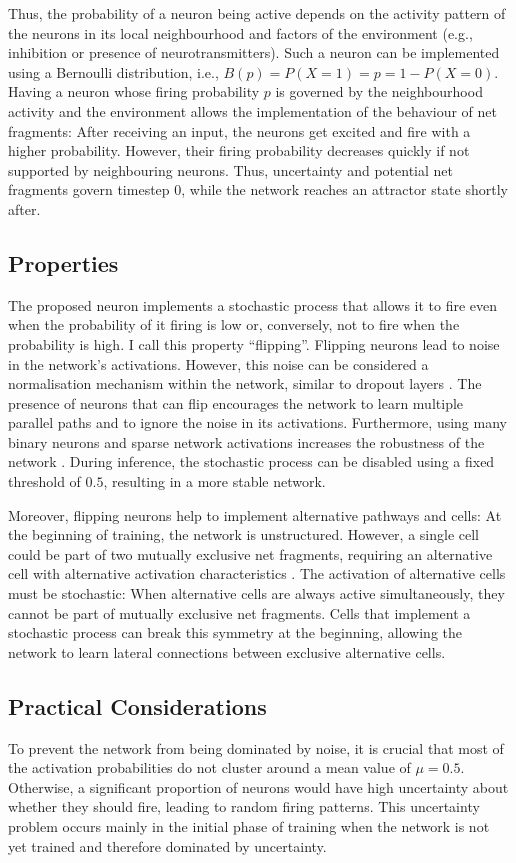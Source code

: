 Thus, the probability of a neuron being active depends on the activity pattern of the neurons in its local neighbourhood and factors of the environment (e.g., inhibition or presence of neurotransmitters).
Such a neuron can be implemented using a Bernoulli distribution, i.e., $B(p) = P(X = 1) = p = 1 - P(X=0)$. Having a neuron whose firing probability $p$ is governed by the neighbourhood activity and the environment allows the implementation of the behaviour of net fragments: After receiving an input, the neurons get excited and fire with a higher probability. However, their firing probability decreases quickly if not supported by neighbouring neurons. Thus, uncertainty and potential net fragments govern timestep 0, while the network reaches an attractor state shortly after. 

\subsection{Properties}
The proposed neuron implements a stochastic process that allows it to fire even when the probability of it firing is low or, conversely, not to fire when the probability is high.
I call this property ``flipping''.
Flipping neurons lead to noise in the network's activations.
However, this noise can be considered a normalisation mechanism within the network, similar to dropout layers .
The presence of neurons that can flip encourages the network to learn multiple parallel paths and to ignore the noise in its activations.
Furthermore, using many binary neurons and sparse network activations increases the robustness of the network .
During inference, the stochastic process can be disabled using a fixed threshold of $0.5$, resulting in a more stable network.

Moreover, flipping neurons help to implement alternative pathways and cells: At the beginning of training, the network is unstructured.
However, a single cell could be part of two mutually exclusive net fragments, requiring an alternative cell with alternative activation characteristics .
The activation of alternative cells must be stochastic:
When alternative cells are always active simultaneously, they cannot be part of mutually exclusive net fragments.
Cells that implement a stochastic process can break this symmetry at the beginning, allowing the network to learn lateral connections between exclusive alternative cells.

\subsection{Practical Considerations}
To prevent the network from being dominated by noise, it is crucial that most of the activation probabilities do not cluster around a mean value of $\mu = 0.5$. Otherwise, a significant proportion of neurons would have high uncertainty about whether they should fire, leading to random firing patterns. This uncertainty problem occurs mainly in the initial phase of training when the network is not yet trained and therefore dominated by uncertainty.

